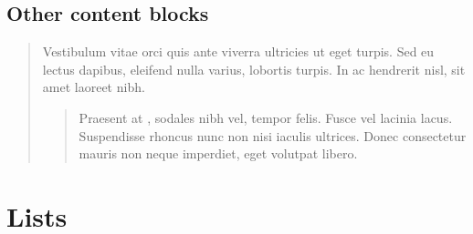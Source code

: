 \documentclass[letterpaper,10pt,english]{sphinxmanual}
\begin{document}
\subsection{Other content blocks}
\label{\detokenize{specimen:other-content-blocks}}\begin{quote}

Vestibulum vitae orci quis ante viverra ultricies ut eget turpis. Sed
eu lectus dapibus, eleifend nulla varius, lobortis turpis. In ac
hendrerit nisl, sit amet laoreet nibh.
\begin{quote}

Praesent at , sodales nibh vel, tempor
felis. Fusce vel lacinia lacus. Suspendisse rhoncus nunc non nisi
iaculis ultrices. Donec consectetur mauris non neque imperdiet,
eget volutpat libero.
\end{quote}

%
\begin{sphinxVerbatim}[commandchars=\\\{\}]
    
           
       \PYG{p}{[}\PYG{p}{]}
         
      \PYG{p}{[}\PYG{p}{]}  \PYG{p}{[}\PYG{p}{]}
   
\end{sphinxVerbatim}
\sphinxresetverbatimhllines
\end{quote}


\section{Lists}
\label{\detokenize{specimen:lists}}
\end{document}
